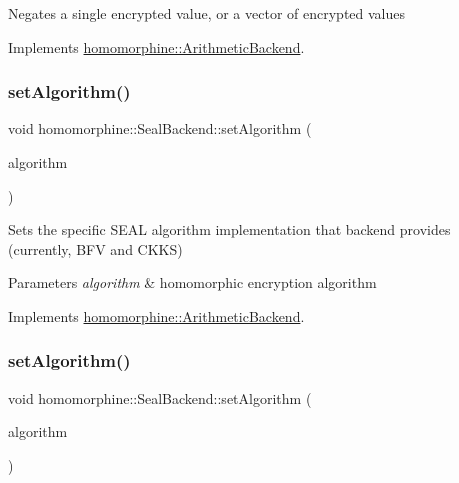 Negates a single encrypted value, or a vector of encrypted values 

Implements \mbox{\hyperlink{classhomomorphine_1_1_arithmetic_backend_ad27913060534c42b5812a1e4cf21475f}{homomorphine\+::\+Arithmetic\+Backend}}.

\mbox{\label{classhomomorphine_1_1_seal_backend_a46a336bca80c5450a1f3ea1125d0d0e8}} 
\subsubsection{\texorpdfstring{setAlgorithm()}{setAlgorithm()}\hspace{0.1cm}{\footnotesize\ttfamily [1/2]}}
{\footnotesize\ttfamily void homomorphine\+::\+Seal\+Backend\+::set\+Algorithm (\begin{DoxyParamCaption}\item[{string}]{algorithm }\end{DoxyParamCaption})\hspace{0.3cm}{\ttfamily [virtual]}}

Sets the specific S\+E\+AL algorithm implementation that backend provides (currently, B\+FV and C\+K\+KS)


\begin{DoxyParams}{Parameters}
{\em algorithm} & homomorphic encryption algorithm \\
\hline
\end{DoxyParams}


Implements \mbox{\hyperlink{classhomomorphine_1_1_arithmetic_backend_ac53135f4f66a2f7a33d3c6e6d465b86f}{homomorphine\+::\+Arithmetic\+Backend}}.

\mbox{\label{classhomomorphine_1_1_seal_backend_a6fe83c3f4e6610888e2cf4c6b9717ede}} 
\subsubsection{\texorpdfstring{setAlgorithm()}{setAlgorithm()}\hspace{0.1cm}{\footnotesize\ttfamily [2/2]}}
{\footnotesize\ttfamily void homomorphine\+::\+Seal\+Backend\+::set\+Algorithm (\begin{DoxyParamCaption}\item[{Seal\+Algorithm\+Type}]{algorithm }\end{DoxyParamCaption})}

